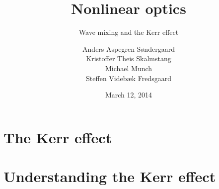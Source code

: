 \documentclass[xcolor=svgnames,smaller]{beamer}
\title{Nonlinear optics}
\subtitle{Wave mixing and the Kerr effect}
\author{
  Anders Aspegren Søndergaard \\
  Kristoffer Theis Skalmstang \\
  Michael Munch \\
  Steffen Videbæk Fredsgaard \\
}
\date{March 12, 2014}
\begin{document}

\frame{\titlepage}



\section{The Kerr effect}



\section{Understanding the Kerr effect}

\end{document}
